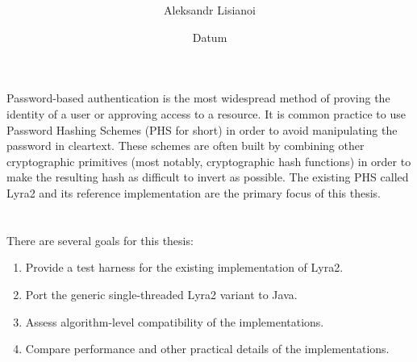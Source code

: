 \documentclass[a4paper,10pt,english]{INSOexpose}
\title{
	\langchooser{
		Lyra2 implementation in Java
	}{
		Vorl\"aufiger Arbeitstitel der Arbeit
	}
}
\author{Aleksandr Lisianoi}
\date{Datum}
\begin{document}
\maketitle

\section{}

Password-based authentication is the most widespread method of proving the identity of a user or approving access to a resource. It is common practice to use Password Hashing Schemes (PHS for short) in order to avoid manipulating the password in cleartext. These schemes are often built by combining other cryptographic primitives (most notably, cryptographic hash functions) in order to make the resulting hash as difficult to invert as possible. The existing PHS called Lyra2 \cite{Andrade:2016:Lyra2} and its reference implementation are the primary focus of this thesis. 

\section{}

There are several goals for this thesis:

\begin{enumerate}
\item Provide a test harness for the existing implementation of Lyra2.
\item Port the generic single-threaded Lyra2 variant to Java.
\item Assess algorithm-level compatibility of the implementations.
\item Compare performance and other practical details of the implementations.
\end{enumerate}

\section{}
\end{document}
